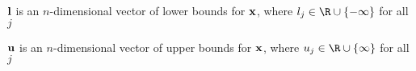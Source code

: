 \item $\mathbf{l}$ is an $n$-dimensional vector of lower
bounds for $\mathbf{x}$, where $l_j\in\R\cup\{-\infty\}$ for all $j$
\item $\mathbf{u}$ is an $n$-dimensional vector of upper bounds for
$\mathbf{x}$, where $u_j\in\R\cup\{\infty\}$ for all $j$
